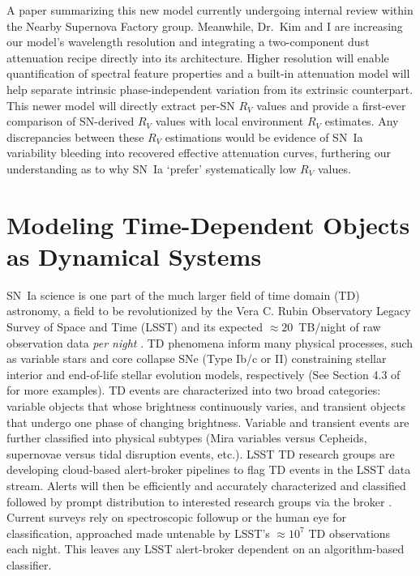 \documentclass[modern]{aastex631}
\begin{document}
A paper summarizing this new model currently undergoing internal review within the Nearby Supernova Factory group. 
Meanwhile, Dr.\ Kim and I are increasing our model's wavelength resolution and integrating a two-component dust attenuation recipe directly into its architecture.  
Higher resolution will enable quantification of spectral feature properties and a built-in attenuation model will help separate intrinsic phase-independent variation from its extrinsic counterpart. 
This newer model will directly extract per-SN $R_V$ values and provide a first-ever comparison of SN-derived $R_V$ values with local environment $R_V$ estimates. 
Any discrepancies between these $R_V$ estimations would be evidence of SN~Ia variability bleeding into recovered effective attenuation curves, furthering our understanding as to why SN~Ia `prefer' systematically low $R_V$ values. 

\section{Modeling Time-Dependent Objects as Dynamical Systems}
SN~Ia science is one part of the much larger field of time domain (TD) astronomy, a field to be revolutionized by the Vera C. Rubin Observatory Legacy Survey of Space and Time (LSST) and its expected $\approx20$~TB/night of raw observation data \textit{per night} \citep{Narayan2018,Zeljko2019}. 
TD phenomena inform many physical processes, such as variable stars and core collapse SNe (Type Ib/c or II) constraining stellar interior and end-of-life stellar evolution models, respectively (See Section 4.3 of~\cite{Zeljko2019} for more examples). 
TD events are characterized into two broad categories: variable objects that whose brightness continuously varies, and transient objects that undergo one phase of changing brightness. 
Variable and transient events are further classified into physical subtypes (Mira variables versus Cepheids, supernovae versus tidal disruption events, etc.).
LSST TD research groups are developing cloud-based alert-broker pipelines to flag TD events in the LSST data stream. 
Alerts will then be efficiently and accurately characterized and classified followed by prompt distribution to interested research groups via the broker \citep{Narayan2018}. 
Current surveys rely on spectroscopic followup or the human eye for classification, approached made untenable by LSST's $\approx10^7$ TD observations each night. 
This leaves any LSST alert-broker dependent on an algorithm-based classifier. 
\end{document}

